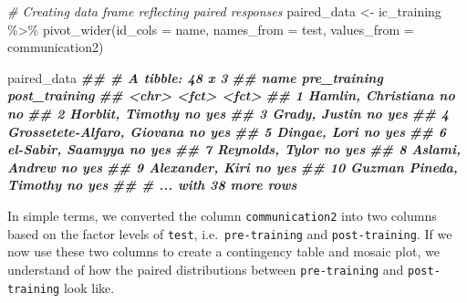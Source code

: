 \documentclass[
]{book}
\newenvironment{Shaded}{\begin{snugshade}}{\end{snugshade}}
\newcommand{\AttributeTok}[1]{\textcolor[rgb]{0.77,0.63,0.00}{#1}}
\newcommand{\CommentTok}[1]{\textcolor[rgb]{0.56,0.35,0.01}{\textit{#1}}}
\newcommand{\DocumentationTok}[1]{\textcolor[rgb]{0.56,0.35,0.01}{\textbf{\textit{#1}}}}
\newcommand{\FunctionTok}[1]{\textcolor[rgb]{0.00,0.00,0.00}{#1}}
\newcommand{\NormalTok}[1]{#1}
\newcommand{\OtherTok}[1]{\textcolor[rgb]{0.56,0.35,0.01}{#1}}
\newcommand{\SpecialCharTok}[1]{\textcolor[rgb]{0.00,0.00,0.00}{#1}}
\begin{document}
\begin{Shaded}
\begin{Highlighting}[]
\CommentTok{\# Creating data frame reflecting paired responses}
\NormalTok{paired\_data }\OtherTok{\textless{}{-}}\NormalTok{ ic\_training }\SpecialCharTok{\%\textgreater{}\%}
  \FunctionTok{pivot\_wider}\NormalTok{(}\AttributeTok{id\_cols =}\NormalTok{ name,}
              \AttributeTok{names\_from =}\NormalTok{ test,}
              \AttributeTok{values\_from =}\NormalTok{ communication2)}

\NormalTok{paired\_data}
\DocumentationTok{\#\# \# A tibble: 48 x 3}
\DocumentationTok{\#\#    name                       pre\_training post\_training}
\DocumentationTok{\#\#    \textless{}chr\textgreater{}                      \textless{}fct\textgreater{}        \textless{}fct\textgreater{}        }
\DocumentationTok{\#\#  1 Hamlin, Christiana         no           no           }
\DocumentationTok{\#\#  2 Horblit, Timothy           no           yes          }
\DocumentationTok{\#\#  3 Grady, Justin              no           yes          }
\DocumentationTok{\#\#  4 Grossetete{-}Alfaro, Giovana no           yes          }
\DocumentationTok{\#\#  5 Dingae, Lori               no           yes          }
\DocumentationTok{\#\#  6 el{-}Sabir, Saamyya          no           yes          }
\DocumentationTok{\#\#  7 Reynolds, Tylor            no           yes          }
\DocumentationTok{\#\#  8 Aslami, Andrew             no           yes          }
\DocumentationTok{\#\#  9 Alexander, Kiri            no           yes          }
\DocumentationTok{\#\# 10 Guzman Pineda, Timothy     no           yes          }
\DocumentationTok{\#\# \# ... with 38 more rows}
\end{Highlighting}
\end{Shaded}

In simple terms, we converted the column \texttt{communication2} into two columns based on the factor levels of \texttt{test}, i.e.~\texttt{pre-training} and \texttt{post-training}. If we now use these two columns to create a contingency table and mosaic plot, we understand of how the paired distributions between \texttt{pre-training} and \texttt{post-training} look like.
\end{document}
